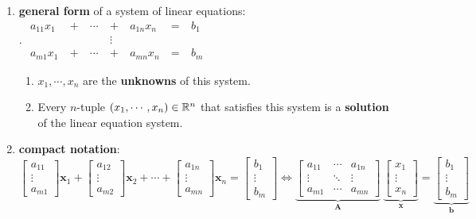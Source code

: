 \begin{enumerate}
    \item \textbf{general form} of a system of linear equations:
    \\
    .\hfill
    $
        \begin{aligned}
            a_{11}x_1\  & +\ & \cdots\ & +\ & a_{1n}x_n\ & =\ & b_1 \\
            & & & \vdots \\
            a_{m1}x_1\  & +\ & \cdots\ & +\ & a_{mn}x_n\ & =\ & b_m
        \end{aligned}
    $
    \hfill \cite{mfml/book/mml/Deisenroth-Faisal-Ong}
    \vspace{0.2cm}
    \begin{enumerate}
        \item $x_1, \cdots , x_n$ are the \textbf{unknowns} of this system.

        \item Every $n$-tuple $(x_1, \cdots , x_n) \in \mathbb{R}^n$ that satisfies this system is a \textbf{solution} of the linear equation system.
    \end{enumerate}


    \item \textbf{compact notation}:
    \\[0.2cm]
    $
        \begin{bmatrix}a_{11}\\ \vdots\\ a_{m1}\end{bmatrix} \bm{x}_1 +
        \begin{bmatrix}a_{12}\\ \vdots\\ a_{m2}\end{bmatrix} \bm{x}_2 +
        \cdots +
        \begin{bmatrix}a_{1n}\\ \vdots\\ a_{mn}\end{bmatrix} \bm{x}_n =
        \begin{bmatrix}b_{1}\\ \vdots\\ b_{m}\end{bmatrix}
    \Longleftrightarrow
        \underset{\displaystyle\bm{A}}{\underbrace{\begin{bmatrix}
            a_{11} & \cdots & a_{1n} \\
            \vdots & \ddots & \vdots \\
            a_{m1} & \cdots & a_{mn}
        \end{bmatrix}}} \
        \underset{\displaystyle\bm{x}}{\underbrace{\begin{bmatrix} x_{1} \\ \vdots \\ x_{n} \end{bmatrix}}}
        =
        \underset{\displaystyle\bm{b}}{\underbrace{\begin{bmatrix} b_{1} \\ \vdots \\ b_{m} \end{bmatrix}}}
    $
    \hfill \cite{mfml/book/mml/Deisenroth-Faisal-Ong}


\end{enumerate}
